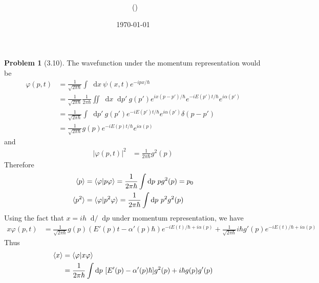 \documentclass[twoside,11pt]{article}
\title{{\lms \Code \ \Ass}}
\author{\lms \name \ (\href{mailto:\mail}{\mail})}
\date{\sffamily \today}
\makeatletter
\renewcommand*\d{\mathop{}\!\mathrm{d}}
\theoremstyle{definition}
\newtheorem{problem}{Problem}
\theoremstyle{remark}
\newtheorem*{remark}{Remark}
\renewcommand{\maketitle}{\bgroup\setlength{\parindent}{0pt}
\begin{flushleft}
  \textbf{\Large\@title}

  \@author
\end{flushleft}\egroup
}
\makeatother
\begin{document}
\maketitle
\thispagestyle{title}


\begin{problem}[3.10]
    The wavefunction under the momentum representation would be 
    \begin{align*}
        \varphi(p, t) &= \frac{1}{\sqrt{2\pi\hbar}}\int\d x\ \psi(x, t)e^{-ipx/\hbar}\\
        &= \frac{1}{\sqrt{2\pi\hbar}}\frac{1}{2\pi\hbar}
        \iint\d x\d p'\ g(p') e^{ix(p-p')/\hbar}e^{-iE(p')t/\hbar}e^{i\alpha(p')}\\
        &= \frac{1}{\sqrt{2\pi\hbar}}\int\d p'\ g(p')e^{-iE(p')t/\hbar}e^{i\alpha(p')}\delta(p-p')\\
        &= \frac{1}{\sqrt{2\pi\hbar}} g(p)e^{-iE(p)t/\hbar}e^{i\alpha(p)}
    \end{align*}
    and
    \begin{align*}
        |\varphi(p, t)|^2 &= \frac{1}{2\pi\hbar}g^2(p)
    \end{align*}
    Therefore
    \begin{align*}
        \braket{p} &= \braket{\varphi|p \varphi} = \frac{1}{2\pi\hbar}\int\d p\ pg^2(p) = p_0\\
        \braket{p^2} &= \braket{\varphi|p^2\varphi} = \frac{1}{2\pi\hbar}\int\d p\ p^2g^2(p)
    \end{align*}
    Using the fact that $x = ih\d/\d p$ under momentum representation, we have
    \begin{align*}
        x\varphi(p, t) &= \frac{1}{\sqrt{2\pi\hbar}} g(p)(E'(p)t - \alpha'(p)\hbar)
        e^{-iE(t)/\hbar + i\alpha(p)} + \frac{1}{\sqrt{2\pi\hbar}}i\hbar g'(p)e^{-iE(t)/\hbar + i\alpha(p)}
    \end{align*}
    Thus
    \begin{align*}
        \braket{x} &= \braket{\varphi|x\varphi} \\
        &= \frac{1}{2\pi\hbar}\int\d p\
        [E'(p)-\alpha'(p)\hbar] g^2(p) + i\hbar g(p)g'(p)\\

\end{align*}
\end{problem}
\end{document}

